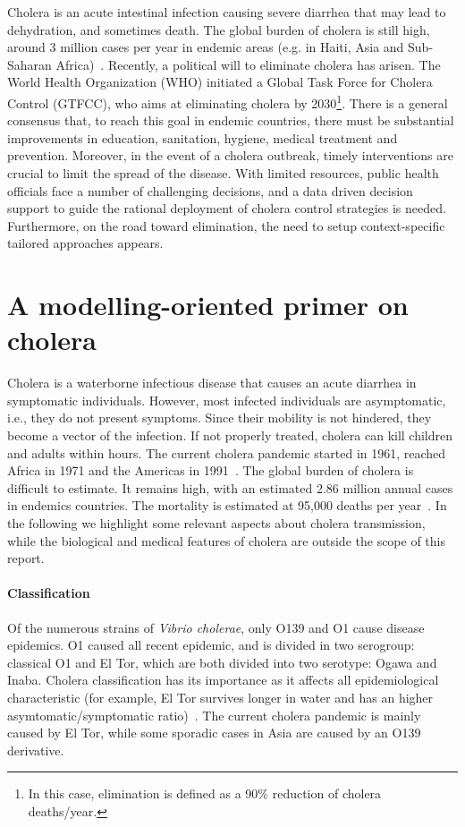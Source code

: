 Cholera is an acute intestinal infection causing severe diarrhea that may lead to dehydration, and sometimes death. The global burden of cholera is still high, around 3 million cases per year in endemic areas (e.g. in Haiti, Asia and Sub-Saharan Africa)~\cite{ali_updated_2015}. 
Recently, a political will to eliminate cholera has arisen. The World Health Organization (WHO) initiated a Global Task Force for Cholera Control (GTFCC), who aims at eliminating cholera by 2030\footnote{In this case, elimination is defined as a 90\% reduction of cholera deaths/year.}. There is a general consensus that, to reach this goal in endemic countries, there must be substantial improvements in education, sanitation, hygiene, medical treatment and prevention. Moreover, in the event of a cholera outbreak, timely interventions are crucial to limit the spread of the disease. With limited resources, public health officials face a number of challenging decisions, and a data driven decision support to guide the rational deployment of cholera control strategies is needed. Furthermore, on the road toward elimination, the need to setup context-specific tailored approaches appears. 

\section{A modelling-oriented primer on cholera} 

Cholera is a waterborne infectious disease that causes an acute diarrhea in symptomatic individuals. However, most infected individuals are asymptomatic, i.e., they do not present symptoms. Since their mobility is not hindered, they become a vector of the infection. If not properly treated, cholera can kill children and adults within hours. The current cholera pandemic started in 1961, reached Africa in 1971 and the Americas in 1991~\cite{mutreja_evidence_2011}. The global burden of cholera is difficult to estimate. It remains high, with an estimated 2.86 million annual cases in endemics countries. The mortality is estimated at 95,000 deaths per year~\cite{ali_updated_2015}. In the following we highlight some relevant aspects about cholera transmission, while the biological and medical features of cholera are outside the scope of this report. 

\paragraph{Classification} Of the numerous strains of \emph{Vibrio cholerae}, only O139 and O1 cause disease epidemics. O1 caused all recent epidemic, and is divided in two serogroup: classical O1 and El Tor, which are both divided into two serotype: Ogawa and Inaba. Cholera classification has its importance as it affects all epidemiological characteristic (for example, El Tor survives longer in water and has an higher asymtomatic/symptomatic ratio)~\cite{who_cholera_2017}. The current cholera pandemic is mainly caused by El Tor, while some sporadic cases in Asia are caused by an O139 derivative. 


